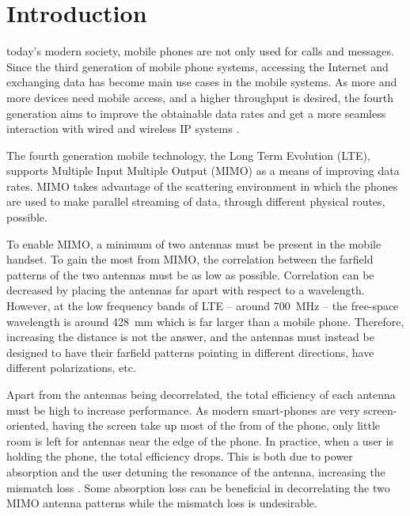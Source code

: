 \section{Introduction}
\label{sec:introduction}

 today's modern society, mobile phones are not only used for calls and messages. Since the third generation of mobile phone systems, accessing the Internet and exchanging data has become main use cases in the mobile systems. As more and more devices need mobile access, and a higher throughput is desired, the fourth generation aims to improve the obtainable data rates and get a more seamless interaction with wired and wireless IP systems \cite{tanenbaum2012computer}.

The fourth generation mobile technology, the Long Term Evolution (LTE),  supports Multiple Input Multiple Output (MIMO) as a means of improving data rates. MIMO takes advantage of the scattering environment in which the phones are used to make parallel streaming of data, through different physical routes, possible.

To enable MIMO, a minimum of two antennas must be present in the mobile handset. To gain the most from MIMO, the correlation between the farfield patterns of the two antennas must be as low as possible. Correlation can be decreased by placing the antennas far apart with respect to a wavelength. However, at the low frequency bands of LTE -- around \SI{700}{MHz} -- the free-space wavelength is around \SI{428}{mm} which is far larger than a mobile phone. Therefore, increasing the distance is not the answer, and the antennas must instead be designed to have their farfield patterns pointing in different directions, have different polarizations, etc.

Apart from the antennas being decorrelated, the total efficiency of each antenna must be high to increase performance. As modern smart-phones are very screen-oriented, having the screen take up most of the from of the phone, only little room is left for antennas near the edge of the phone. In practice, when a user is holding the phone, the total efficiency drops. This is both due to power absorption and the user detuning the resonance of the antenna, increasing the mismatch loss \cite{Samantha2014UserEff}. Some absorption loss can be beneficial in decorrelating the two MIMO antenna patterns \cite{Samantha2014UserEff} while the mismatch loss is undesirable.

